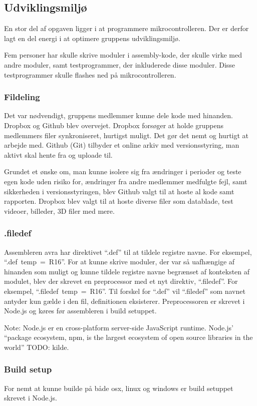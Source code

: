 \subsection{Udviklingsmiljø}

En stor del af opgaven ligger i at programmere mikrocontrolleren. Der er derfor lagt en del energi i at optimere gruppens udviklingsmiljø.

Fem personer har skulle skrive moduler i assembly-kode, der skulle virke med andre moduler, samt testprogrammer, der inkluderede disse moduler. Disse testprogrammer skulle flashes ned på mikrocontrolleren.

\subsubsection{Fildeling}
Det var nødvendigt, gruppens medlemmer kunne dele kode med hinanden. Dropbox og Github blev overvejet.
Dropbox forsøger at holde gruppens medlemmers filer synkroniseret, hurtigst muligt.
Det gør det nemt og hurtigt at arbejde med.
Github (Git) tilbyder et online arkiv med versionsstyring, man aktivt skal hente fra og uploade til.

Grundet et ønske om, man kunne isolere sig fra ændringer i perioder og teste egen kode uden risiko for, ændringer fra andre medlemmer medfulgte fejl, samt sikkerheden i versionsstyringen, blev Github valgt til at hoste al kode samt rapporten.
Dropbox blev valgt til at hoste diverse filer som datablade, test videoer, billeder, 3D filer med mere.

\subsubsection{.filedef}
Assembleren avra har direktivet \mbox{``.def''} til at tildele registre navne. For eksempel, \mbox{``.def temp = R16''}.
For at kunne skrive moduler, der var så uafhængige af hinanden som muligt og kunne tildele registre navne begrænset af konteksten af modulet, blev der skrevet en preprocessor med et nyt direktiv, \mbox{``.filedef''}. For eksempel, \mbox{``.filedef temp = R16''}. Til forskel for \mbox{``.def''} vil \mbox{``.filedef''} som navnet antyder kun gælde i den fil, definitionen eksisterer. Preprocessoren er skrevet i Node.js og køres før assembleren i build setuppet.

\begin{mdquote}
	Note: Node.js er en cross-platform server-side JavaScript runtime. Node.js' ``package ecosystem, npm, is the largest ecosystem of open source libraries in the world'' TODO: kilde.
\end{mdquote}

\subsubsection{Build setup}
For nemt at kunne builde på både osx, linux og windows er build setuppet skrevet i Node.js.
